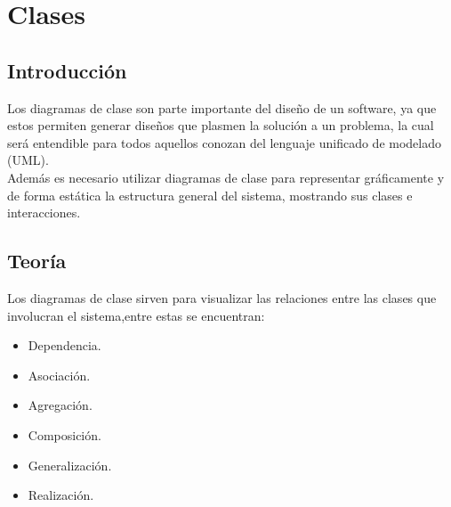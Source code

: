 \chapter{Clases}
\section{Introducción}
Los diagramas de clase son parte importante del diseño de un software, ya que estos permiten generar diseños que plasmen la solución a un problema, la cual será entendible para todos aquellos conozan del lenguaje unificado de modelado (UML).
\\
Además es necesario utilizar diagramas de clase para representar gráficamente y de forma estática la estructura general del sistema, mostrando sus clases e interacciones.
\section{Teoría}
Los diagramas de clase sirven para visualizar las relaciones entre las clases que involucran el sistema,entre estas se encuentran:
\begin{itemize}
\item Dependencia.
\item Asociación.
\item Agregación.
\item Composición.
\item Generalización.
\item Realización.
\end{itemize}

